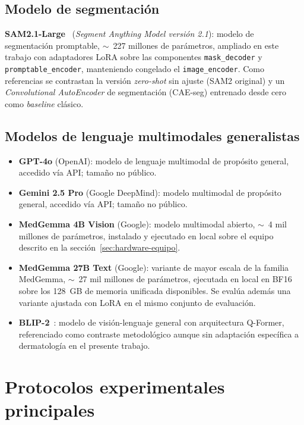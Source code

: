 \subsection{Modelo de segmentación}
\label{sec:modelos-segmentacion}

\textbf{SAM2.1-Large}~\cite{sam2} (\emph{Segment Anything Model
versión 2.1}): modelo de segmentación promptable, $\sim$~227
millones de parámetros, ampliado en este trabajo con adaptadores
LoRA sobre las componentes \texttt{mask\_decoder} y
\texttt{promptable\_encoder}, manteniendo congelado el
\texttt{image\_encoder}. Como referencias se contrastan la versión
\emph{zero-shot} sin ajuste (SAM2 original) y un \emph{Convolutional
AutoEncoder} de segmentación (CAE-seg) entrenado desde cero como
\emph{baseline} clásico.

\subsection{Modelos de lenguaje multimodales generalistas}
\label{sec:modelos-llm}

\begin{itemize}
\item \textbf{GPT-4o} (OpenAI): modelo de lenguaje multimodal de
propósito general, accedido vía API; tamaño no público.

\item \textbf{Gemini 2.5 Pro} (Google DeepMind): modelo multimodal
de propósito general, accedido vía API; tamaño no público.

\item \textbf{MedGemma 4B Vision} (Google): modelo multimodal
abierto, $\sim$~4 mil millones de parámetros, instalado y ejecutado
en local sobre el equipo descrito en la
sección~\ref{sec:hardware-equipo}.

\item \textbf{MedGemma 27B Text} (Google): variante de mayor escala
de la familia MedGemma, $\sim$~27 mil millones de parámetros,
ejecutada en local en BF16 sobre los 128~GB de memoria unificada
disponibles. Se evalúa además una variante ajustada con LoRA en el
mismo conjunto de evaluación.

\item \textbf{BLIP-2}~\cite{blip2_2023}: modelo de visión-lenguaje
general con arquitectura Q-Former, referenciado como contraste
metodológico aunque sin adaptación específica a dermatología en el
presente trabajo.
\end{itemize}

\section{Protocolos experimentales principales}
\label{sec:protocolos-base}

